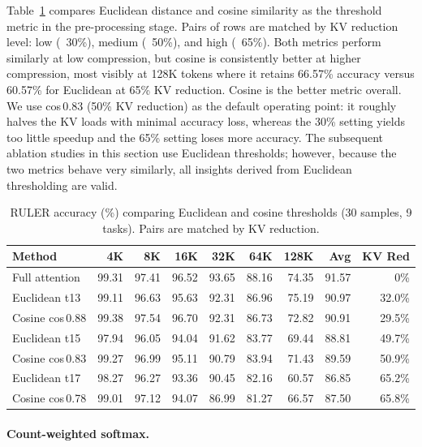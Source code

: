 Table~\ref{tab:ablation_threshold} compares Euclidean distance and cosine similarity as the threshold metric in the pre-processing stage. Pairs of rows are matched by KV reduction level: low (~30\%), medium (~50\%), and high (~65\%). Both metrics perform similarly at low compression, but cosine is consistently better at higher compression, most visibly at 128K tokens where it retains 66.57\% accuracy versus 60.57\% for Euclidean at 65\% KV reduction. Cosine is the better metric overall. We use cos\,0.83 (50\% KV reduction) as the default operating point: it roughly halves the KV loads with minimal accuracy loss, whereas the 30\% setting yields too little speedup and the 65\% setting loses more accuracy. The subsequent ablation studies in this section use Euclidean thresholds; however, because the two metrics behave very similarly, all insights derived from Euclidean thresholding are valid.

\begin{table}[!ht]
\centering
\caption{RULER accuracy (\%) comparing Euclidean and cosine thresholds (30 samples, 9 tasks). Pairs are matched by KV reduction.}
\label{tab:ablation_threshold}
\begin{tabular}{lrrrrrrrr}
\toprule
Method & 4K & 8K & 16K & 32K & 64K & 128K & Avg & KV Red \\
\midrule
Full attention              & 99.31 & 97.41 & 96.52 & 93.65 & 88.16 & 74.35 & 91.57 & 0\%    \\
\midrule
Euclidean t13               & 99.11 & 96.63 & 95.63 & 92.31 & 86.96 & 75.19 & 90.97 & 32.0\% \\
Cosine cos\,0.88               & 99.38 & 97.54 & 96.70 & 92.31 & 86.73 & 72.82 & 90.91 & 29.5\% \\
\midrule
Euclidean t15               & 97.94 & 96.05 & 94.04 & 91.62 & 83.77 & 69.44 & 88.81 & 49.7\% \\
Cosine cos\,0.83               & 99.27 & 96.99 & 95.11 & 90.79 & 83.94 & 71.43 & 89.59 & 50.9\% \\
\midrule
Euclidean t17               & 98.27 & 96.27 & 93.36 & 90.45 & 82.16 & 60.57 & 86.85 & 65.2\% \\
Cosine cos\,0.78               & 99.01 & 97.12 & 94.07 & 86.99 & 81.27 & 66.57 & 87.50 & 65.8\% \\
\bottomrule
\end{tabular}
\end{table}

\paragraph{Count-weighted softmax.}


